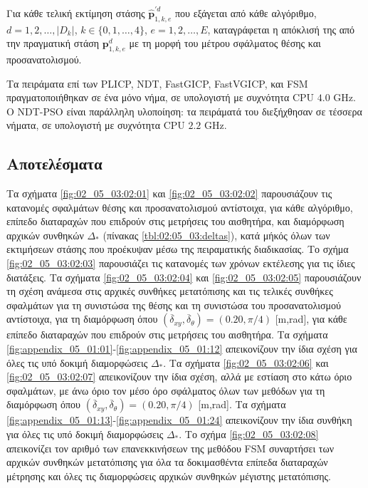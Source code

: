 Για κάθε τελική εκτίμηση στάσης $\hat{\bm{p}}_{1,k,e}^{\prime d}$ που εξάγεται
από κάθε αλγόριθμο, $d = 1,2,\dots,|D_k|$, $k \in \{0,1,\dots,4\}$,
$e=1,2,\dots,E$, καταγράφεται η απόκλισή της από την πραγματική στάση
$\bm{p}_{1,k,e}^d$ με τη μορφή του μέτρου σφάλματος θέσης και προσανατολισμού.

Τα πειράματα επί των  PLICP, NDT, FastGICP, FastVGICP, και FSM
πραγματοποιήθηκαν σε ένα μόνο νήμα, σε υπολογιστή με συχνότητα CPU $4.0$ GHz. Ο
NDT-PSO είναι παράλληλη υλοποίηση: τα πειράματά του διεξήχθησαν σε τέσσερα
νήματα, σε υπολογιστή με συχνότητα CPU $2.2$ GHz.




\subsection{Αποτελέσματα}
\label{subsection:02_05_03:02}

Τα σχήματα \ref{fig:02_05_03:02:01} και \ref{fig:02_05_03:02:02} παρουσιάζουν
τις κατανομές σφαλμάτων θέσης και προσανατολισμού αντίστοιχα, για κάθε
αλγόριθμο, επίπεδο διαταραχών που επιδρούν στις μετρήσεις του αισθητήρα, και
διαμόρφωση αρχικών συνθηκών $\Delta_\ast$ (πίνακας \ref{tbl:02:05_03:deltas}),
κατά μήκός όλων των εκτιμήσεων στάσης που προέκυψαν μέσω της πειραματικής
διαδικασίας. Το σχήμα \ref{fig:02_05_03:02:03} παρουσιάζει τις κατανομές των
χρόνων εκτέλεσης για τις ίδιες διατάξεις. Τα σχήματα \ref{fig:02_05_03:02:04}
και \ref{fig:02_05_03:02:05} παρουσιάζουν τη σχέση ανάμεσα στις αρχικές
συνθήκες μετατόπισης και τις τελικές συνθήκες σφαλμάτων για τη συνιστώσα της
θέσης και τη συνιστώσα του προσανατολισμού αντίστοιχα, για τη διαμόρφωση όπου
$(\overline{\delta}_{xy}, \overline{\delta}_{\theta}) = (0.20, \pi/4)$ [m,rad],
για κάθε επίπεδο διαταραχών που επιδρούν στις μετρήσεις του αισθητήρα.  Τα
σχήματα \ref{fig:appendix_05_01:01}-\ref{fig:appendix_05_01:12} απεικονίζουν
την ίδια σχέση για όλες τις υπό δοκιμή διαμορφώσεις $\Delta_\ast$.  Τα σχήματα
\ref{fig:02_05_03:02:06} και \ref{fig:02_05_03:02:07} απεικονίζουν την ίδια
σχέση, αλλά με εστίαση στο κάτω όριο σφαλμάτων, με άνω όριο τον μέσο όρο
σφάλματος όλων των μεθόδων για τη διαμόρφωση όπου $(\overline{\delta}_{xy},
\overline{\delta}_{\theta}) = (0.20, \pi/4)$ [m,rad]. Τα σχήματα
\ref{fig:appendix_05_01:13}-\ref{fig:appendix_05_01:24} απεικονίζουν την ίδια
συνθήκη για όλες τις υπό δοκιμή διαμορφώσεις $\Delta_*$. Το σχήμα
\ref{fig:02_05_03:02:08} απεικονίζει τον αριθμό των επανεκκινήσεων της μεθόδου
FSM συναρτήσει των αρχικών συνθηκών μετατόπισης για όλα τα
δοκιμασθέντα επίπεδα διαταραχών μέτρησης και όλες τις διαμορφώσεις αρχικών
συνθηκών μέγιστης μετατόπισης.

